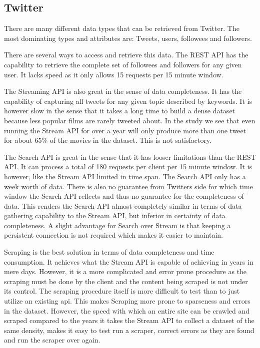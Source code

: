 \subsection{Twitter}\label{sec:prestrud-eval-twitter}
There are many different data types that can be retrieved from Twitter. The most dominating types and attributes are: Tweets, users, followees and followers.

There are several ways to access and retrieve this data. The REST API has the capability to retrieve the complete set of followees and followers for any given user. It lacks speed as it only allows 15 requests per 15 minute window.

The Streaming API is also great in the sense of data completeness. It has the capability of capturing all tweets for any given topic described by keywords. It is however slow in the sense that it takes a long time to build a dense dataset because less popular films are rarely tweeted about. In the study we see that even running the Stream API for over a year will only produce more than one tweet for about 65\% of the movies in the dataset. This is not satisfactory.

The Search API is great in the sense that it has looser limitations than the REST API. It can process a total of 180 requests per client per 15 minute window. It is however, like the Stream API limited in time span. The Search API only has a week worth of data. There is also no guarantee from Twitters side for which time window the Search API reflects and thus no guarantee for the completeness of data. This renders the Search API almost completely similar in terms of data gathering capability to the Stream API, but inferior in certainty of data completeness. A slight advantage for Search over Stream is that keeping a persistent connection is not required which makes it easier to maintain.

Scraping is the best solution in terms of data completeness and time consumption. It achieves what the Stream API is capable of achieving in years in mere days. However, it is a more complicated and error prone procedure as the scraping must be done by the client and the content being scraped is not under its control. The scraping procedure itself is more difficult to test than to just utilize an existing api. This makes Scraping more prone to sparseness and errors in the dataset. However, the speed with which an entire site can be crawled and scraped compared to the years it takes the Stream API to collect a dataset of the same density, makes it easy to test run a scraper, correct errors as they are found and run the scraper over again.


